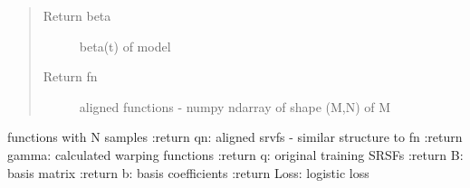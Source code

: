 \documentclass[letterpaper,10pt,english]{sphinxmanual}
\begin{document}
\begin{fulllineitems}
\begin{quote}
\begin{description}
\item[{Return beta}] \leavevmode
beta(t) of model

\item[{Return fn}] \leavevmode
aligned functions - numpy ndarray of shape (M,N) of M

\end{description}\end{quote}

functions with N samples
:return qn: aligned srvfs - similar structure to fn
:return gamma: calculated warping functions
:return q: original training SRSFs
:return B: basis matrix
:return b: basis coefficients
:return Loss: logistic loss

\end{fulllineitems}

\end{document}
